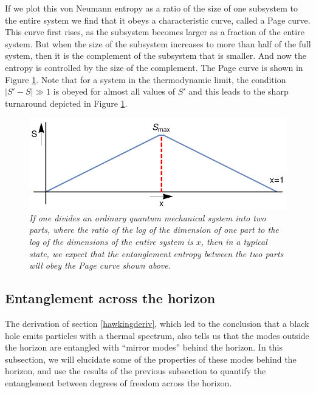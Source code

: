 \documentclass[12pt]{article}
\begin{document}
If we plot this von Neumann entropy as a ratio of the size of one subsystem to the entire system we find that it obeys a characteristic curve, called a Page curve. This curve first rises, as the subsystem becomes larger as a fraction of the entire system. But when the size of the subsystem increases to more than half of the full system, then it is the complement of the subsystem that is smaller. And now the entropy is controlled by the size of the complement.  The Page curve is shown in Figure \ref{figpage}. Note that for a system in the thermodynamic limit, the condition $|S' - S| \gg 1$ is obeyed for almost all values of $S'$ and this leads to the sharp turnaround depicted in Figure \ref{figpage}.
\begin{figure}[!ht]
\begin{center}
\includegraphics[width=\textwidth]{naivepage.pdf}
\caption{\em If one divides an ordinary quantum mechanical system into two parts, where the ratio of the log of the dimension of one part to the log of the dimensions of the  entire system is $x$, then in a typical state, we expect that the entanglement entropy between the two parts will obey the Page curve shown above. \label{figpage}}
\end{center}
\end{figure}
\subsection{Entanglement across the horizon \label{entangacrosshor}}




The derivation of section \ref{hawkingderiv}, which led to the conclusion that a black hole emits particles
with a thermal spectrum, also tells us that the modes outside the horizon are entangled with ``mirror modes''
behind the horizon.  In this subsection, we will elucidate some of the properties of these modes behind the horizon, and use the results of the previous subsection to quantify the entanglement between degrees of freedom across the horizon. 
\end{document}
